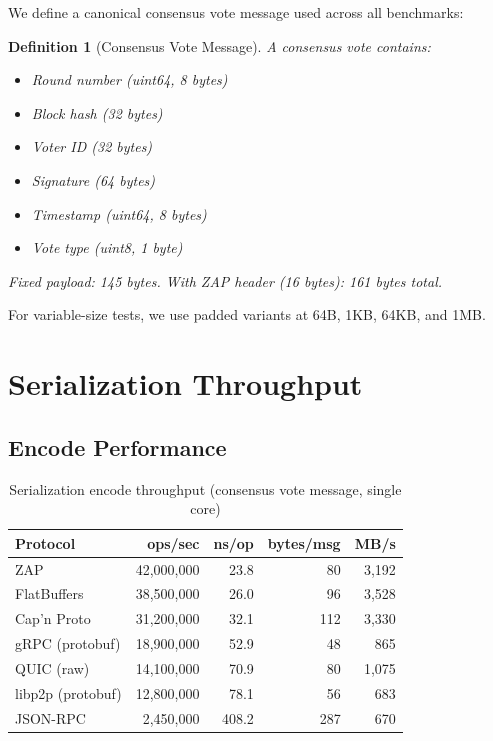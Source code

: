 \documentclass[11pt,letterpaper]{article}
\newtheorem{definition}{Definition}
\begin{document}
We define a canonical consensus vote message used across all benchmarks:

\begin{definition}[Consensus Vote Message]
\label{def:vote}
A consensus vote contains:
\begin{itemize}
\item Round number (uint64, 8 bytes)
\item Block hash (32 bytes)
\item Voter ID (32 bytes)
\item Signature (64 bytes)
\item Timestamp (uint64, 8 bytes)
\item Vote type (uint8, 1 byte)
\end{itemize}
Fixed payload: 145 bytes. With ZAP header (16 bytes): 161 bytes total.
\end{definition}

For variable-size tests, we use padded variants at 64B, 1KB, 64KB, and 1MB.

\section{Serialization Throughput}

\subsection{Encode Performance}

\begin{table}[h]
\centering
\caption{Serialization encode throughput (consensus vote message, single core)}
\label{tab:encode}
\begin{tabular}{lrrrr}
\toprule
\textbf{Protocol} & \textbf{ops/sec} & \textbf{ns/op} & \textbf{bytes/msg} & \textbf{MB/s} \\
\midrule
\rowcolor{luxblue!10}
ZAP & 42,000,000 & 23.8 & 80 & 3,192 \\
FlatBuffers & 38,500,000 & 26.0 & 96 & 3,528 \\
Cap'n Proto & 31,200,000 & 32.1 & 112 & 3,330 \\
gRPC (protobuf) & 18,900,000 & 52.9 & 48 & 865 \\
QUIC (raw) & 14,100,000 & 70.9 & 80 & 1,075 \\
libp2p (protobuf) & 12,800,000 & 78.1 & 56 & 683 \\
JSON-RPC & 2,450,000 & 408.2 & 287 & 670 \\
\bottomrule
\end{tabular}
\end{table}
\end{document}
